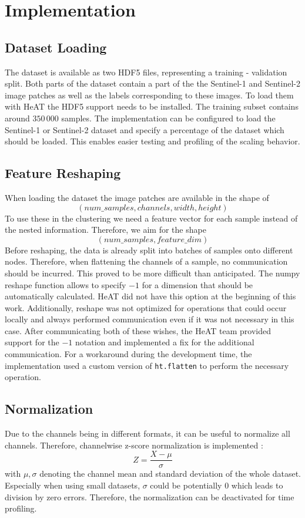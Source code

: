 \section{Implementation}
\label{sec:implementation}

\subsection{Dataset Loading}
\label{subsec:dataset_loading}
The dataset is available as two \gls{HDF5} files, representing a training - validation split.
Both parts of the dataset contain a part of the the Sentinel-1 and Sentinel-2 image patches as well as the labels corresponding to these images.
To load them with \gls{HeAT} the \gls{HDF5} support needs to be installed.
The training subset contains around \(350\,000\) samples.
The implementation can be configured to load the Sentinel-1 or Sentinel-2 dataset and specify a percentage of the dataset which should be loaded.
This enables easier testing and profiling of the scaling behavior.


\subsection{Feature Reshaping}
\label{subsec:feature_reshaping}
When loading the dataset the image patches are available in the shape of \[(num\_samples, channels, width, height)\]
To use these in the clustering we need a feature vector for each sample instead of the nested information.
Therefore, we aim for the shape
 \[(num\_samples, feature\_dim)\]
Before reshaping, the data is already split into batches of samples onto different nodes. Therefore, when flattening the channels of a sample, no communication should be incurred.
This proved to be more difficult than anticipated. The \gls{numpy} reshape function allows to specify \(-1\) for a dimension that should be automatically calculated.
\gls{HeAT} did not have this option at the beginning of this work.
Additionally, reshape was not optimized for operations that could occur locally and always performed communication even
if it was not necessary in this case. After communicating both of these wishes, the \gls{HeAT} team provided support for the \(-1\) notation and
implemented a fix for the additional communication.
For a workaround during the development time, the implementation used a custom version of \lstinline{ht.flatten} to perform the necessary operation.

\subsection{Normalization}
\label{subsec:normalization}
Due to the channels being in different formats, it can be useful to normalize all channels.
Therefore, channelwise z-score normalization is implemented \cite{wooldridge_introductory_2012}:
\[Z = \frac{X - \mu}{\sigma}\]
with \(\mu, \sigma\) denoting the channel mean and standard deviation of the whole dataset.
Especially when using small datasets, \(\sigma\) could be potentially \(0\) which leads to division by zero errors.
Therefore, the normalization can be deactivated for time profiling.

